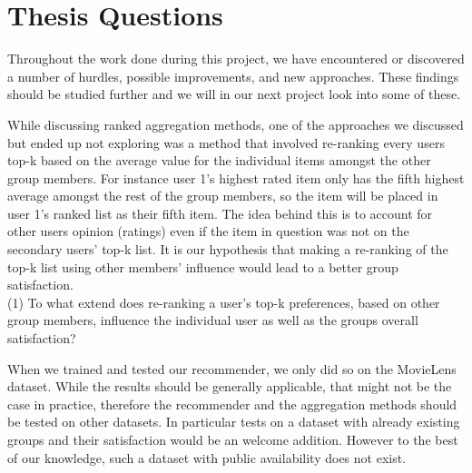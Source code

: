 \section{Thesis Questions}
Throughout the work done during this project, we have encountered or discovered a number of hurdles, possible improvements, and new approaches. These findings should be studied further and we will in our next project look into some of these.

While discussing ranked aggregation methods, one of the approaches we discussed but ended up not exploring was a method that involved re-ranking every users top-k based on the average value for the individual items amongst the other group members. For instance user 1's highest rated item only has the fifth highest average amongst the rest of the group members, so the item will be placed in user 1's ranked list as their fifth item. The idea behind this is to account for other users opinion (ratings) even if the item in question was not on the secondary users' top-k list. It is our hypothesis that making a re-ranking of the top-k list using other members' influence would lead to a better group satisfaction.\\

(1) To what extend does re-ranking a user's top-k preferences, based on other group members, influence the individual user as well as the groups overall satisfaction?

When we trained and tested our recommender, we only did so on the MovieLens dataset. While the results should be generally applicable, that might not be the case in practice, therefore the recommender and the aggregation methods should be tested on other datasets. In particular tests on a dataset with already existing groups and their satisfaction would be an welcome addition. However to the best of our knowledge, such a dataset with public availability does not exist.

